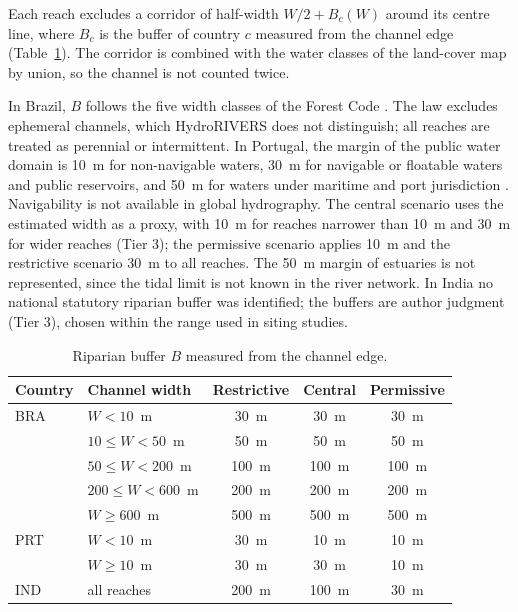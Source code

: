 Each reach excludes a corridor of half-width $W/2 + B_c(W)$ around its
centre line, where $B_c$ is the buffer of country $c$ measured from the
channel edge (Table~\ref{tab:g6_riparian}). The corridor is combined with
the water classes of the land-cover map by union, so the channel is not
counted twice.

In Brazil, $B$ follows the five width classes of the Forest Code
\cite{brasil2012forestcode}. The law excludes ephemeral channels, which
HydroRIVERS does not distinguish; all reaches are treated as perennial or
intermittent. In Portugal, the margin of the public water domain is
10~m for non-navigable waters, 30~m for navigable or floatable waters and
public reservoirs, and 50~m for waters under maritime and port
jurisdiction \cite{portugal2005lei54}. Navigability is not available in
global hydrography. The central scenario uses the estimated width as a
proxy, with 10~m for reaches narrower than 10~m and 30~m for wider
reaches (Tier 3); the permissive scenario applies 10~m and the
restrictive scenario 30~m to all reaches. The 50~m margin of estuaries
is not represented, since the tidal limit is not known in the river
network. In India no national statutory riparian buffer was identified;
the buffers are author judgment (Tier 3), chosen within the range used
in siting studies.

\begin{table}[htbp]
    \centering
    \caption{Riparian buffer $B$ measured from the channel edge.}
    \label{tab:g6_riparian}
    \small
    \begin{tabular}{llccc}
        \toprule
        Country & Channel width & Restrictive & Central & Permissive \\
        \midrule
        BRA & $W<10$~m          & 30~m  & 30~m  & 30~m \\
            & $10\le W<50$~m    & 50~m  & 50~m  & 50~m \\
            & $50\le W<200$~m   & 100~m & 100~m & 100~m \\
            & $200\le W<600$~m  & 200~m & 200~m & 200~m \\
            & $W\ge 600$~m      & 500~m & 500~m & 500~m \\
        PRT & $W<10$~m          & 30~m  & 10~m  & 10~m \\
            & $W\ge 10$~m       & 30~m  & 30~m  & 10~m \\
        IND & all reaches       & 200~m & 100~m & 30~m \\
        \bottomrule
    \end{tabular}
\end{table}

